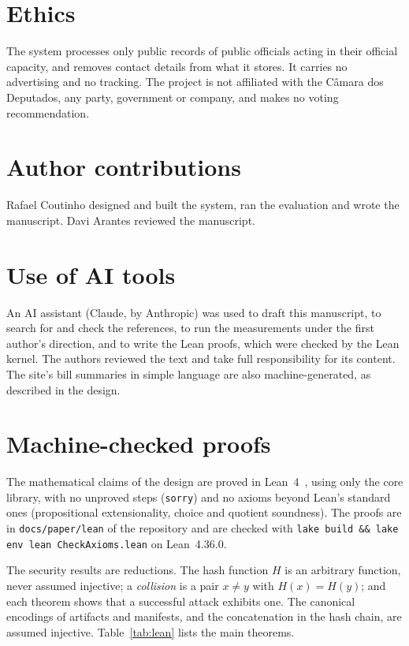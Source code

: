 \documentclass[11pt,a4paper]{article}
\begin{document}
\section*{Ethics}

The system processes only public records of public officials acting in their official capacity, and removes contact details from what it stores. It carries no advertising and no tracking. The project is not affiliated with the C\^amara dos Deputados, any party, government or company, and makes no voting recommendation.

\section*{Author contributions}

Rafael Coutinho designed and built the system, ran the evaluation and wrote the manuscript. Davi Arantes reviewed the manuscript.

\section*{Use of AI tools}

An AI assistant (Claude, by Anthropic) was used to draft this manuscript, to search for and check the references, to run the measurements under the first author's direction, and to write the Lean proofs, which were checked by the Lean kernel. The authors reviewed the text and take full responsibility for its content. The site's bill summaries in simple language are also machine-generated, as described in the design.




\appendix
\section{Machine-checked proofs}
\label{app:lean}

The mathematical claims of the design are proved in Lean~4~\citep{moura2021lean4}, using only the core library, with no unproved steps (\texttt{sorry}) and no axioms beyond Lean's standard ones (propositional extensionality, choice and quotient soundness). The proofs are in \texttt{docs/paper/lean} of the repository and are checked with \texttt{lake build \&\& lake env lean CheckAxioms.lean} on Lean~4.36.0.

The security results are reductions. The hash function $H$ is an arbitrary function, never assumed injective; a \emph{collision} is a pair $x\neq y$ with $H(x)=H(y)$; and each theorem shows that a successful attack exhibits one. The canonical encodings of artifacts and manifests, and the concatenation in the hash chain, are assumed injective. Table~\ref{tab:lean} lists the main theorems.
\end{document}
